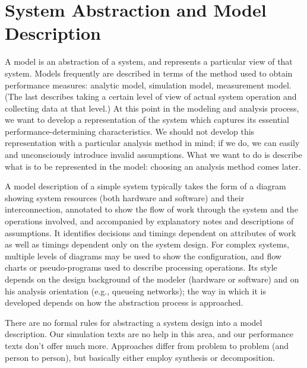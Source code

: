 \section{System Abstraction and Model Description}
\label{sec:system-abstraction-model-description}

A model is an abstraction of a system, and represents a particular view of
that system. Models frequently are described in terms of the method used to
obtain performance measures: analytic model, simulation model, measurement
model. (The last describes taking a certain level of view of actual system
operation and collecting data at that level.) At this point in the modeling
and analysis process, we want to develop a representation of the system which
captures its essential performance-determining characteristics. We should not
develop this representation with a particular analysis method in mind; if we
do, we can easily and unconsciously introduce invalid assumptions. What we
want to do is describe what is to be represented in the model: choosing an
analysis method comes later.

A model description of a simple system typically takes the form of a diagram
showing system resources (both hardware and software) and their
interconnection, annotated to show the flow of work through the system and
the operations involved, and accompanied by explanatory notes and
descriptions of assumptions. It identifies decisions and timings dependent on
attributes of work as well as timings dependent only on the system design. For
complex systems, multiple levels of diagrams may be used to show the
configuration, and flow charts or pseudo-programs used to describe processing
operations. Its style depends on the design background of the modeler
(hardware or software) and on his analysis orientation (e.g., queueing
networks); the way in which it is developed depends on how the abstraction
process is approached.

There are no formal rules for abstracting a system design into a model
description. Our simulation texts are no help in this area, and our
performance texts don't offer much more. Approaches differ from problem to
problem (and person to person), but basically either employ synthesis or
 decomposition.

